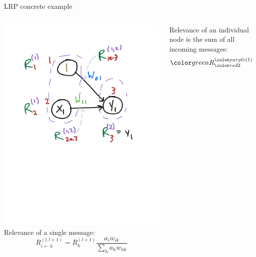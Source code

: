 \documentclass[xetex,compress]{beamer}
\makeatletter
\def\mathcolor#1#{\@mathcolor{#1}}
\def\@mathcolor#1#2#3{%
  \protect\leavevmode
  \begingroup
    \color#1{#2}#3%
  \endgroup
}
\makeatother
\begin{document}

\begin{frame}{LRP concrete example}
  \begin{columns}
    \begin{column}{0.5\textwidth}
      \includegraphics[width=1.0\textwidth]{./figures/lr_nn_6.pdf} \\
      Relevance of a single message:
      \begin{equation*}
        R_{i \leftarrow k}^{(l,l+1)} = R_{k}^{(l+1)} \frac{a_{i} w_{ik}}{\sum_{h} a_{h} w_{hk}}
      \end{equation*}
    \end{column}
    \begin{column}{0.5\textwidth}
      Relevance of an individual node is the sum of all incoming messages:
      \begin{equation*}
        \mathcolor{green}{R}_{\mathcolor{red}{2}}^{\mathcolor{purple}{(1)}} = \mathcolor{green}{R}_{\mathcolor{red}{2\leftarrow 3}}^{\mathcolor{purple}{(1,2)}}

\end{equation*}
\end{column}
\end{columns}
\end{frame}
\end{document}
